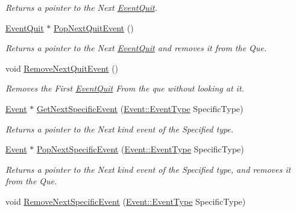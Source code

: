 \begin{DoxyCompactItemize}
\begin{DoxyCompactList}\small\item\em Returns a pointer to the Next \hyperlink{classphys_1_1EventQuit}{EventQuit}. \item\end{DoxyCompactList}\item 
\hyperlink{classphys_1_1EventQuit}{EventQuit} $\ast$ \hyperlink{classphys_1_1EventManager_a9b0d8e4d76fef35423bb862d7127b747}{PopNextQuitEvent} ()
\begin{DoxyCompactList}\small\item\em Returns a pointer to the Next \hyperlink{classphys_1_1EventQuit}{EventQuit} and removes it from the Que. \item\end{DoxyCompactList}\item 
void \hyperlink{classphys_1_1EventManager_a5031871aa6e044764ec2963228f735dd}{RemoveNextQuitEvent} ()
\begin{DoxyCompactList}\small\item\em Removes the First \hyperlink{classphys_1_1EventQuit}{EventQuit} From the que without looking at it. \item\end{DoxyCompactList}\item 
\hyperlink{classphys_1_1Event}{Event} $\ast$ \hyperlink{classphys_1_1EventManager_ad0242442d4663b8f2b17824cbf38452b}{GetNextSpecificEvent} (\hyperlink{classphys_1_1Event_af5fdbb3e08d8e578d58770fbc606fda7}{Event::EventType} SpecificType)
\begin{DoxyCompactList}\small\item\em Returns a pointer to the Next kind event of the Specified type. \item\end{DoxyCompactList}\item 
\hyperlink{classphys_1_1Event}{Event} $\ast$ \hyperlink{classphys_1_1EventManager_ab96c53c888cdb6ed29ec0d2ce6e7b646}{PopNextSpecificEvent} (\hyperlink{classphys_1_1Event_af5fdbb3e08d8e578d58770fbc606fda7}{Event::EventType} SpecificType)
\begin{DoxyCompactList}\small\item\em Returns a pointer to the Next kind event of the Specified type, and removes it from the Que. \item\end{DoxyCompactList}\item 
void \hyperlink{classphys_1_1EventManager_aa15f81b71bde3e14048ec1fefa9d3591}{RemoveNextSpecificEvent} (\hyperlink{classphys_1_1Event_af5fdbb3e08d8e578d58770fbc606fda7}{Event::EventType} SpecificType)

\end{DoxyCompactItemize}
